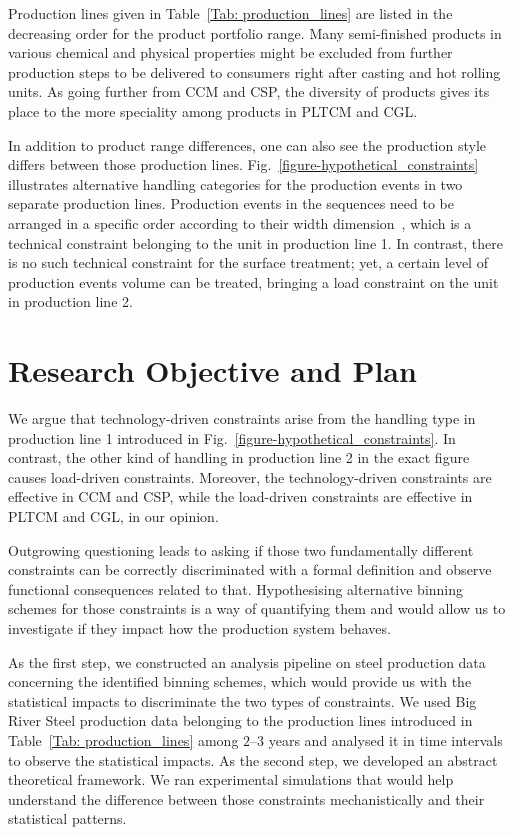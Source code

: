 Production lines given in Table~\ref{Tab: production_lines} are listed in the decreasing order for the product portfolio range. Many semi-finished products in various chemical and physical properties might be excluded from further production steps to be delivered to consumers right after casting and hot rolling units. As going further from CCM and CSP, the diversity of products gives its place to the more speciality among products in PLTCM and CGL.



In addition to product range differences, one can also see the production style differs between those production lines. Fig.~\ref{figure-hypothetical_constraints} illustrates alternative handling categories for the production events in two separate production lines. Production events in the sequences need to be arranged in a specific order according to their width dimension~\cite{OZGUR2021106606}, which is a technical constraint belonging to the unit in production line 1. In contrast, there is no such technical constraint for the surface treatment; yet, a certain level of production events volume can be treated, bringing a load constraint on the unit in production line 2.

\section{Research Objective and Plan}

We argue that technology-driven constraints arise from the handling type in production line 1 introduced in Fig.~\ref{figure-hypothetical_constraints}. In contrast, the other kind of handling in production line 2 in the exact figure causes load-driven constraints. Moreover, the technology-driven constraints are effective in CCM and CSP, while the load-driven constraints are effective in PLTCM and CGL, in our opinion.

Outgrowing questioning leads to asking if those two fundamentally different constraints can be correctly discriminated with a formal definition and observe functional consequences related to that. Hypothesising alternative binning schemes for those constraints is a way of quantifying them and would allow us to investigate if they impact how the production system behaves.

As the first step, we constructed an analysis pipeline on steel production data concerning the identified binning schemes, which would provide us with the statistical impacts to discriminate the two types of constraints. We used Big River Steel production data belonging to the production lines introduced in Table~\ref{Tab: production_lines} among $2$--$3$ years and analysed it in time intervals to observe the statistical impacts. As the second step, we developed an abstract theoretical framework. We ran experimental simulations that would help understand the difference between those constraints mechanistically and their statistical patterns.

